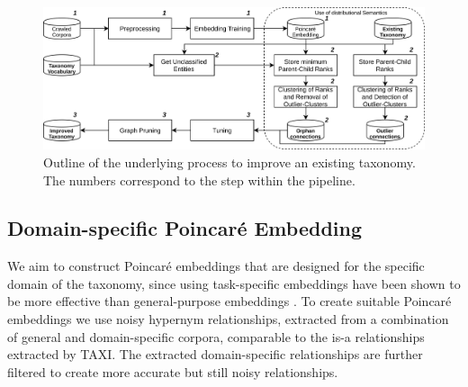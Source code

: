 \documentclass[12pt, headsepline, a4paper]{scrartcl}
\begin{document}
\begin{figure}[tp]
	\includegraphics[width=1\textwidth]{images/process_chart7.png}
	\caption{Outline of the underlying process to improve an existing taxonomy. The numbers correspond to the step within the pipeline.}
	\label{process_chart}
\end{figure}




\subsection{Domain-specific Poincaré Embedding}
\label{Poincare_step}

We aim to construct Poincaré embeddings that are designed for the specific domain of the taxonomy, since using task-specific embeddings have been shown to be more effective than general-purpose embeddings \citep{Li2016JointEO, wang2017short}.
To create suitable Poincaré embeddings we use noisy hypernym relationships, extracted from a combination of general and domain-specific corpora, comparable to the is-a relationships extracted by TAXI. The extracted domain-specific relationships are further filtered to create more accurate but still noisy relationships.

\end{document}
